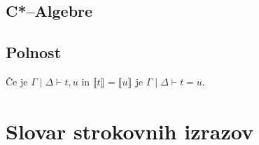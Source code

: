 \documentclass[mat1]{fmfdelo}
\newcommand{\cmd}[1]{\textnormal{\sffamily#1}}
\newcommand{\sequent}[3]{#1 \mid #2 \vdash #3}
\newcommand{\seq}[1]{\sequent{\Gamma}{\Delta}{#1}}
\newcommand{\sem}[2][]{{\llbracket#2\rrbracket}_{#1}}
\begin{document}
\subsection{C*--Algebre}
\subsection{Polnost}
\begin{izrek}[Polnost]
    Če je \(\seq{t, u}\) in \(\sem t = \sem u\) je \(\seq{t = u}\).
\end{izrek}



\section*{Slovar strokovnih izrazov}

\geslo{}{}
\geslo{}{}

\begin{thebibliography}{99}


\end{thebibliography}
\end{document}
